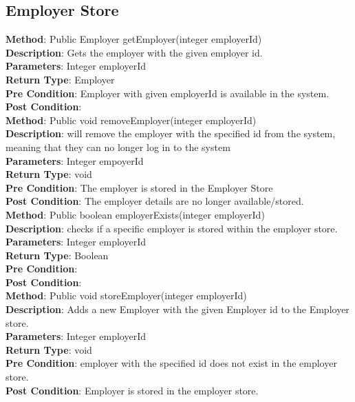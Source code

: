 \documentclass{l3deliverable}
\begin{document}
\subsection{Employer Store}

\textbf{Method}: Public Employer getEmployer(integer employerId)\\
\textbf{Description}: Gets the employer with the given employer id.\\
\textbf{Parameters}:  Integer employerId\\
\textbf{Return Type}: Employer\\
\textbf{Pre Condition}: Employer with given employerId is available in the system.\\
\textbf{Post Condition}:\\

\textbf{Method}: Public void removeEmployer(integer employerId) \\
\textbf{Description}: will remove the employer with the specified id from the system, meaning that they can no longer log in to the system\\
\textbf{Parameters}: Integer empoyerId\\
\textbf{Return Type}: void\\
\textbf{Pre Condition}: The employer is stored in the Employer Store\\
\textbf{Post Condition}: The employer details are no longer available/stored.\\

\textbf{Method}: Public boolean employerExists(integer employerId) \\
\textbf{Description}: checks if a specific employer is stored within the employer store.\\
\textbf{Parameters}: Integer employerId\\
\textbf{Return Type}: Boolean\\
\textbf{Pre Condition}:\\
\textbf{Post Condition}:\\

\textbf{Method}: Public void storeEmployer(integer employerId) \\
\textbf{Description}:  Adds a new Employer with the given Employer id to the Employer store.\\
\textbf{Parameters}: Integer employerId\\
\textbf{Return Type}: void\\
\textbf{Pre Condition}: employer with the specified id does not exist in the employer store.\\
\textbf{Post Condition}: Employer is stored in the employer store.\\
\end{document}
